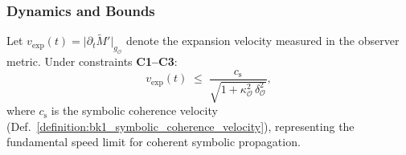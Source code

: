 \subsubsection{Dynamics and Bounds}
\begin{lemma}
\label{lemma:bk4_ttie_expansion_rate}
Let $v_{\text{exp}}(t)=\bigl|\partial_t\widetilde{M}'\bigr|_{g_{\mathcal{O}}}$ denote the expansion velocity measured in the observer metric. Under constraints \textbf{C1--C3}:
\[
v_{\text{exp}}(t)\;\le\;
\frac{c_{\text{s}}}{\sqrt{1+\kappa_{\mathcal{O}}^{2}\,\delta_{\mathcal{O}}^{2}}},
\]
where $c_{\text{s}}$ is the symbolic coherence velocity (Def.~\ref{definition:bk1_symbolic_coherence_velocity}), representing the fundamental speed limit for coherent symbolic propagation.
\end{lemma}

